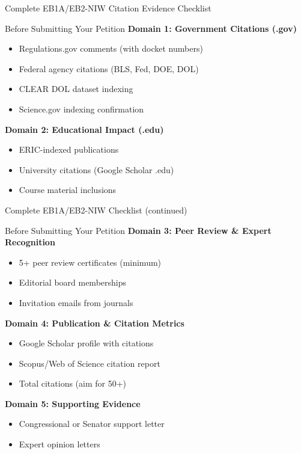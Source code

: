 \documentclass[11pt]{beamer}
\begin{document}
	\begin{frame}{Complete EB1A/EB2-NIW Citation Evidence Checklist}
		\small
		\begin{block}{Before Submitting Your Petition}
			\textbf{Domain 1: Government Citations (.gov)}
			\begin{itemize}
				\item [$\square$] Regulations.gov comments (with docket numbers)
				\item [$\square$] Federal agency citations (BLS, Fed, DOE, DOL)
				\item [$\square$] CLEAR DOL dataset indexing
				\item [$\square$] Science.gov indexing confirmation
			\end{itemize}
			\textbf{Domain 2: Educational Impact (.edu)}
			\begin{itemize}
				\item [$\square$] ERIC-indexed publications
				\item [$\square$] University citations (Google Scholar .edu)
				\item [$\square$] Course material inclusions
			\end{itemize}
		\end{block}
	\end{frame}
	
	\begin{frame}{Complete EB1A/EB2-NIW Checklist (continued)}
		\small
		\begin{block}{Before Submitting Your Petition}
			\textbf{Domain 3: Peer Review \& Expert Recognition}
			\begin{itemize}
				\item [$\square$] 5+ peer review certificates (minimum)
				\item [$\square$] Editorial board memberships
				\item [$\square$] Invitation emails from journals
			\end{itemize}
			\textbf{Domain 4: Publication \& Citation Metrics}
			\begin{itemize}
				\item [$\square$] Google Scholar profile with citations
				\item [$\square$] Scopus/Web of Science citation report
				\item [$\square$] Total citations (aim for 50+)
			\end{itemize}
			\textbf{Domain 5: Supporting Evidence}
			\begin{itemize}
				\item [$\square$] Congressional or Senator support letter
				\item [$\square$] Expert opinion letters
			\end{itemize}
		\end{block}
	\end{frame}
	
\end{document}
